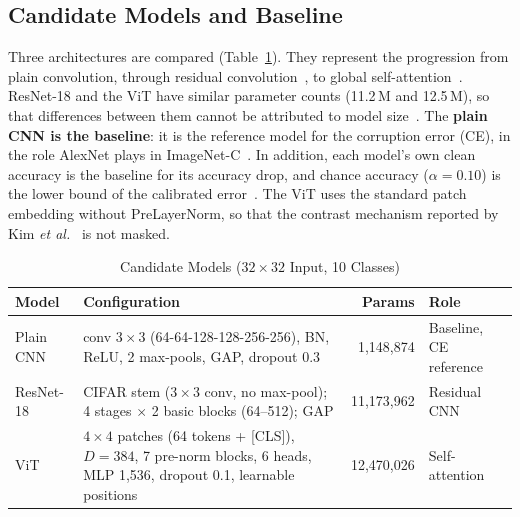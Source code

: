 \documentclass[conference]{IEEEtran}
\begin{document}
\subsection{Candidate Models and Baseline}
Three architectures are compared (Table~\ref{tab:models}). They represent the progression from plain convolution, through residual convolution~\cite{he2016}, to global self-attention~\cite{dosovitskiy2021}. ResNet-18 and the ViT have similar parameter counts (11.2\,M and 12.5\,M), so that differences between them cannot be attributed to model size~\cite{bai2021}. The \textbf{plain CNN is the baseline}: it is the reference model for the corruption error (CE), in the role AlexNet plays in ImageNet-C~\cite{hendrycks2019}. In addition, each model's own clean accuracy is the baseline for its accuracy drop, and chance accuracy ($\alpha = 0.10$) is the lower bound of the calibrated error~\cite{liu2024}. The ViT uses the standard patch embedding without PreLayerNorm, so that the contrast mechanism reported by Kim \emph{et al.}~\cite{kim2023} is not masked.

\begin{table}[!t]
\caption{Candidate Models ($32\times32$ Input, 10 Classes)}
\label{tab:models}
\centering
\footnotesize
\renewcommand{\arraystretch}{1.15}
\begin{tabular}{@{}>{\raggedright\arraybackslash}p{} >{\raggedright\arraybackslash}p{} r >{\raggedright\arraybackslash}p{}@{}}
\toprule
\textbf{Model} & \textbf{Configuration} & \textbf{Params} & \textbf{Role}\\
\midrule
Plain CNN & 6 conv $3\times3$ (64-64-128-128-256-256), BN, ReLU, 2 max-pools, GAP, dropout 0.3 & 1{,}148{,}874 & Baseline, CE reference\\
ResNet-18~\cite{he2016} & CIFAR stem ($3\times3$ conv, no max-pool); 4 stages $\times$ 2 basic blocks (64--512); GAP & 11{,}173{,}962 & Residual CNN\\
ViT~\cite{dosovitskiy2021} & $4\times4$ patches (64 tokens + [CLS]), $D = 384$, 7 pre-norm blocks, 6 heads, MLP 1{,}536, dropout 0.1, learnable positions & 12{,}470{,}026 & Self-attention\\
\bottomrule
\end{tabular}
\end{table}
\end{document}
